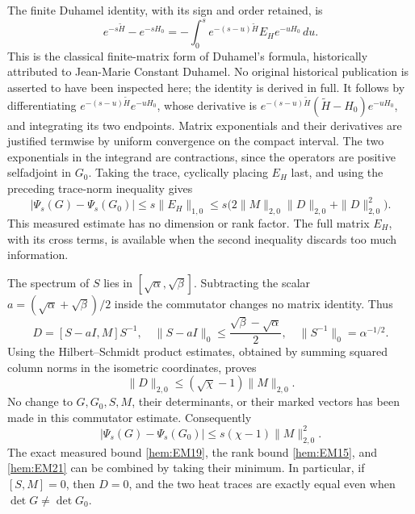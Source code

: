 \documentclass[11pt]{article}
\begin{document}
The finite Duhamel identity, with its sign and order retained, is
\begin{equation}
 e^{-s\widetilde H}-e^{-sH_0}
 =-\int_0^s e^{-(s-u)\widetilde H} E_H e^{-uH_0}\,du.
 \tag{EM18}\label{hem:EM18}
\end{equation}
This is the classical finite-matrix form of Duhamel's formula, historically
attributed to Jean-Marie Constant Duhamel. No original historical publication
is asserted to have been inspected here; the identity is derived in full.
It follows by differentiating
\(e^{-(s-u)\widetilde H}e^{-uH_0}\), whose derivative is
\(e^{-(s-u)\widetilde H}(\widetilde H-H_0)e^{-uH_0}\), and integrating
its two endpoints. Matrix exponentials and their derivatives are
justified termwise by uniform convergence on the compact interval.
The two exponentials in the integrand are contractions, since the
operators are positive selfadjoint in \(G_0\). Taking the trace,
cyclically placing \(E_H\) last, and using the preceding trace-norm
inequality gives
\begin{equation}
 |\Psi_s(G)-\Psi_s(G_0)|\le s\|E_H\|_{1,0}
 \le s\bigl(2\|M\|_{2,0}\|D\|_{2,0}+\|D\|_{2,0}^2\bigr).
 \tag{EM19}\label{hem:EM19}
\end{equation}
This measured estimate has no dimension or rank factor. The full
matrix \(E_H\), with its cross terms, is available when the second
inequality discards too much information.

The spectrum of \(S\) lies in \([\sqrt\alpha,\sqrt\beta]\).
Subtracting the scalar \(a=(\sqrt\alpha+\sqrt\beta)/2\) inside the
commutator changes no matrix identity. Thus
\[
 D=[S-aI,M]S^{-1},\quad
 \|S-aI\|_0\le\frac{\sqrt\beta-\sqrt\alpha}{2},\quad
 \|S^{-1}\|_0=\alpha^{-1/2}.
\]
Using the Hilbert--Schmidt product estimates, obtained by summing
squared column norms in the isometric coordinates, proves
\begin{equation}
 \|D\|_{2,0}\le(\sqrt\chi-1)\|M\|_{2,0}.
 \tag{EM20}\label{hem:EM20}
\end{equation}
No change to \(G,G_0,S,M\), their determinants, or their marked
vectors has been made in this commutator estimate.
Consequently
\begin{equation}
 |\Psi_s(G)-\Psi_s(G_0)|
 \le s(\chi-1)\|M\|_{2,0}^2.
 \tag{EM21}\label{hem:EM21}
\end{equation}
The exact measured bound \eqref{hem:EM19}, the rank bound \eqref{hem:EM15},
and \eqref{hem:EM21} can be combined by taking their minimum.
In particular, if \([S,M]=0\), then \(D=0\), and the two heat traces
are exactly equal even when \(\det G\ne\det G_0\).
\end{document}
